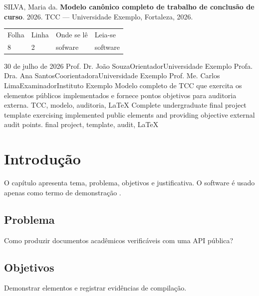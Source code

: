 \documentclass[12pt]{report}
\begin{document}
\ABNTEXacademicoexterna
{}

\ABNTEXacademicopretextual
\ABNTEXfolhaderosto
{}
\ABNTEXerrata
  {SILVA, Maria da. \textbf{Modelo canônico completo de trabalho de
   conclusão de curso}. 2026. TCC — Universidade Exemplo, Fortaleza, 2026.}
  {\begin{center}
     \begin{tabular}{llll}
       Folha & Linha & Onde se lê & Leia-se\\
       8 & 2 & sofware & software
     \end{tabular}
   \end{center}}
\ABNTEXfolhadeaprovacao
  {30 de julho de 2026}
  {%
    \ABNTEXmembrobanca
      {Prof. Dr. João Souza}{Orientador}{Universidade Exemplo}
    \ABNTEXmembrobanca
      {Profa. Dra. Ana Santos}{Coorientadora}{Universidade Exemplo}
    \ABNTEXmembrobanca
      {Prof. Me. Carlos Lima}{Examinador}{Instituto Exemplo}
  }
\ABNTEXresumo
  {Modelo completo de TCC que exercita os elementos públicos implementados e
   fornece pontos objetivos para auditoria externa.}
  {TCC, modelo, auditoria, LaTeX}
\ABNTEXresumoemlinguaestrangeira
  {Complete undergraduate final project template exercising implemented
   public elements and providing objective external audit points.}
  {final project, template, audit, LaTeX}
\ABNTEXlistadeilustracoes
\ABNTEXlistadetabelas
\ABNTEXlistadeabreviaturasesiglas
\ABNTEXlistadesimbolos
\ABNTEXsumario

\ABNTEXacademicotextual
\chapter{Introdução}
O capítulo apresenta tema, problema, objetivos e justificativa. O
\gls{software} é usado apenas como termo de demonstração
\parencite{associacao2025}.
\section{Problema}
Como produzir documentos acadêmicos verificáveis com uma API pública?
\section{Objetivos}
Demonstrar elementos e registrar evidências de compilação.
\end{document}
